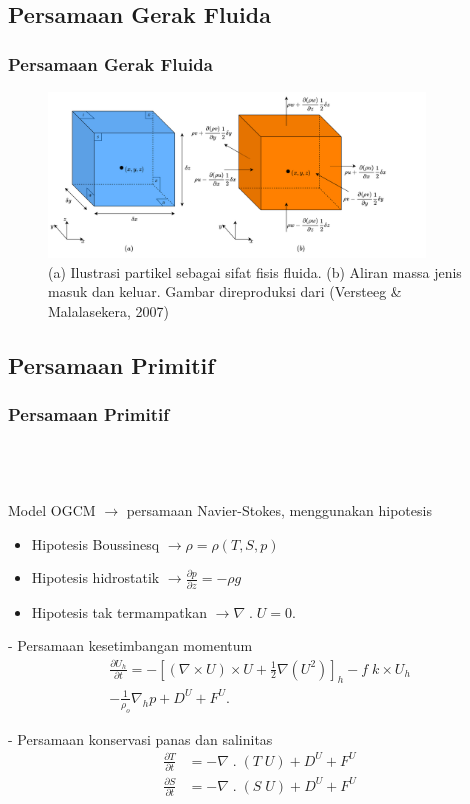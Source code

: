 \documentclass{beamer}
\begin{document}
\subsection{Persamaan Gerak Fluida}
\begin{frame}
	\frametitle{Persamaan Gerak Fluida}
	\begin{figure}[H]
		\centering
		\includegraphics[width=10cm]{cube.png}
		\caption{(a) Ilustrasi partikel sebagai sifat fisis fluida. (b) Aliran massa jenis masuk dan keluar. Gambar direproduksi dari (Versteeg \& Malalasekera, 2007)}
		\label{fig:cube}
	\end{figure}
\end{frame}

\subsection{Persamaan Primitif}
\begin{frame}[allowframebreaks]
	\frametitle{Persamaan Primitif}
	$\;$ \\
	$\;$ \\
	$\;$ \\
	Model OGCM $\rightarrow$ persamaan Navier-Stokes, menggunakan hipotesis
	\begin{itemize}
		\item {\small Hipotesis Boussinesq $\rightarrow \rho = \rho(T,S,p)$}
		\item {\small Hipotesis hidrostatik $\rightarrow \frac{\partial p}{\partial z} = -\rho g$}
		\item {\small Hipotesis tak termampatkan $\rightarrow \nabla \;.\; U = 0$}.
	\end{itemize}
	\newpage
		- Persamaan kesetimbangan momentum
	\begin{equation}
		\begin{aligned}
			\frac{\partial U_h}{\partial t} = - \left[(\nabla \times U) \times U + \frac{1}{2}\nabla (U^2)\right]_h - f \; k \times U_h \\
			- \frac{1}{\rho_o}\nabla_h p + D^U + F^U.
		\end{aligned}
	\end{equation}

	- Persamaan konservasi panas dan salinitas
	\begin{equation}
		\begin{aligned}
			\frac{\partial T}{\partial t} &= - \nabla \; . \; (T\;U)  + D^U + F^U \\
			\frac{\partial S}{\partial t} &= - \nabla \; . \; (S\;U)  + D^U + F^U
		\end{aligned}
	\end{equation}
\end{frame}
\end{document}
